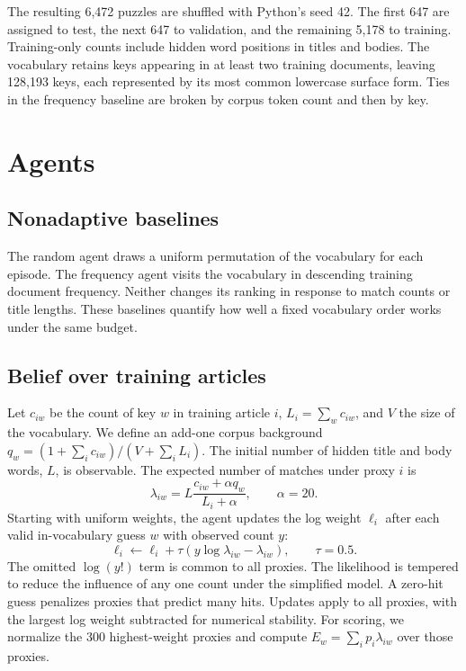\documentclass[conference]{IEEEtran}
\begin{document}
The resulting 6,472 puzzles are shuffled with Python's seed 42. The first 647 are assigned to test, the next 647 to validation, and the remaining 5,178 to training. Training-only counts include hidden word positions in titles and bodies. The vocabulary retains keys appearing in at least two training documents, leaving 128,193 keys, each represented by its most common lowercase surface form. Ties in the frequency baseline are broken by corpus token count and then by key.

\section{Agents}

\subsection{Nonadaptive baselines}
The random agent draws a uniform permutation of the vocabulary for each episode. The frequency agent visits the vocabulary in descending training document frequency. Neither changes its ranking in response to match counts or title lengths. These baselines quantify how well a fixed vocabulary order works under the same budget.

\subsection{Belief over training articles}
Let $c_{iw}$ be the count of key $w$ in training article $i$, $L_i=\sum_w c_{iw}$, and $V$ the size of the vocabulary. We define an add-one corpus background $q_w=(1+\sum_i c_{iw})/(V+\sum_i L_i)$. The initial number of hidden title and body words, $L$, is observable. The expected number of matches under proxy $i$ is
\begin{equation}
 \lambda_{iw}= L\frac{c_{iw}+\alpha q_w}{L_i+\alpha},
 \qquad \alpha=20.
\end{equation}
Starting with uniform weights, the agent updates the log weight $\ell_i$ after each valid in-vocabulary guess $w$ with observed count $y$:
\begin{equation}
 \ell_i \gets \ell_i+\tau(y\log\lambda_{iw}-\lambda_{iw}),
 \qquad \tau=0.5.
\end{equation}
The omitted $\log(y!)$ term is common to all proxies. The likelihood is tempered to reduce the influence of any one count under the simplified model. A zero-hit guess penalizes proxies that predict many hits. Updates apply to all proxies, with the largest log weight subtracted for numerical stability. For scoring, we normalize the 300 highest-weight proxies and compute $E_w=\sum_i p_i\lambda_{iw}$ over those proxies.
\end{document}
